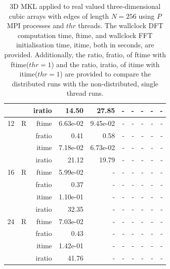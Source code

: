 \documentclass[a4paper]{article}
\begin{document}
\begin{table}[htbp]
\begin{center}
\begin{small}
\begin{tabular}{|r|r|r|r|r|r|r|r|r|r|}
          &      & iratio & 14.50 & 27.85 &     -     &     -     &     -     &     -     &     -     \\ \hline 
     12 & R & ftime & 6.63e-02 & 9.45e-02 &     -     &     -     &     -     &     -     &     -     \\   
          &      & fratio & 0.41 & 0.58 &     -     &     -     &     -     &     -     &     -     \\   
          &      & itime & 7.18e-02 & 6.73e-02 &     -     &     -     &     -     &     -     &     -     \\   
          &      & iratio & 21.12 & 19.79 &     -     &     -     &     -     &     -     &     -     \\ \hline 
     16 & R & ftime & 5.99e-02 &     -     &     -     &     -     &     -     &     -     &     -     \\   
          &      & fratio & 0.37 &     -     &     -     &     -     &     -     &     -     &     -     \\   
          &      & itime & 1.10e-01 &     -     &     -     &     -     &     -     &     -     &     -     \\   
          &      & iratio & 32.35 &     -     &     -     &     -     &     -     &     -     &     -     \\ \hline 
     24 & R & ftime & 7.03e-02 &     -     &     -     &     -     &     -     &     -     &     -     \\   
          &      & fratio & 0.43 &     -     &     -     &     -     &     -     &     -     &     -     \\   
          &      & itime & 1.42e-01 &     -     &     -     &     -     &     -     &     -     &     -     \\   
          &      & iratio & 41.76 &     -     &     -     &     -     &     -     &     -     &     -     \\ \hline 


\end{tabular}
\caption{3D MKL applied to real valued three-dimensional cubic arrays with edges of length $N=256$ using $P$ MPI processes and $thr$ threads. The wallclock DFT computation time, ftime, and wallclock FFT initialisation time, itime, both in seconds, are provided. Additionally, the ratio, fratio, of ftime  with ftime($thr=1$) and the ratio, iratio, of itime  with itime($thr=1$) are provided to compare the distributed runs with the non-distributed, single thread runs.  }\label{TblMKL3d256}
\end{small}
\end{center}
\end{table}
\end{document}

